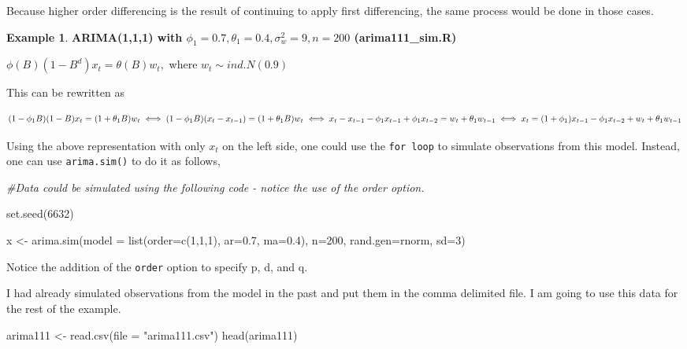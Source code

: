\documentclass[
]{book}
\newenvironment{Shaded}{\begin{snugshade}}{\end{snugshade}}
\newcommand{\AttributeTok}[1]{\textcolor[rgb]{0.77,0.63,0.00}{#1}}
\newcommand{\CommentTok}[1]{\textcolor[rgb]{0.56,0.35,0.01}{\textit{#1}}}
\newcommand{\DecValTok}[1]{\textcolor[rgb]{0.00,0.00,0.81}{#1}}
\newcommand{\FloatTok}[1]{\textcolor[rgb]{0.00,0.00,0.81}{#1}}
\newcommand{\FunctionTok}[1]{\textcolor[rgb]{0.00,0.00,0.00}{#1}}
\newcommand{\NormalTok}[1]{#1}
\newcommand{\OtherTok}[1]{\textcolor[rgb]{0.56,0.35,0.01}{#1}}
\newcommand{\StringTok}[1]{\textcolor[rgb]{0.31,0.60,0.02}{#1}}
\theoremstyle{definition}
\theoremstyle{definition}
\newtheorem{example}{Example}[chapter]
\theoremstyle{definition}
\theoremstyle{definition}
\theoremstyle{remark}
\begin{document}
Because higher order differencing is the result of continuing to apply first differencing, the same process would be done in those cases.

\begin{example}
\textbf{ARIMA(1,1,1) with \(\phi_1=0.7, \theta_1=0.4, \sigma_w^2=9, n=200\) (arima111\_sim.R)}

\(\phi(B)(1-B^d)x_t=\theta(B)w_t,\) where \(w_t \sim ind.N(0.9)\)

This can be rewritten as

\[(1-\phi_1B)(1-B)x_t=(1+\theta_1B)w_t\\
\iff (1-\phi_1B)(x_t-x_{t-1})=(1+\theta_1B)w_t\\
\iff x_t-x_{t-1}-\phi_1x_{t-1}+\phi_1x_{t-2}=w_t+\theta_1w_{t-1}\\
\iff x_t=(1+\phi_1)x_{t-1}-\phi_1x_{t-2}+w_t+\theta_1w_{t-1}\]

Using the above representation with only \(x_t\) on the left side, one could use the \texttt{for\ loop} to simulate observations from this model. Instead, one can use \texttt{arima.sim()} to do it as follows,

\begin{Shaded}
\begin{Highlighting}[]
\CommentTok{\#Data could be simulated using the following code {-} notice the use of the order option.  }

\FunctionTok{set.seed}\NormalTok{(}\DecValTok{6632}\NormalTok{)}

\NormalTok{x }\OtherTok{\textless{}{-}} \FunctionTok{arima.sim}\NormalTok{(}\AttributeTok{model =} \FunctionTok{list}\NormalTok{(}\AttributeTok{order=}\FunctionTok{c}\NormalTok{(}\DecValTok{1}\NormalTok{,}\DecValTok{1}\NormalTok{,}\DecValTok{1}\NormalTok{), }\AttributeTok{ar=}\FloatTok{0.7}\NormalTok{, }\AttributeTok{ma=}\FloatTok{0.4}\NormalTok{), }\AttributeTok{n=}\DecValTok{200}\NormalTok{, }\AttributeTok{rand.gen=}\NormalTok{rnorm, }\AttributeTok{sd=}\DecValTok{3}\NormalTok{)}
\end{Highlighting}
\end{Shaded}

Notice the addition of the \texttt{order} option to specify p, d, and q.

I had already simulated observations from the model in the past and put them in the comma delimited file. I am going to use this data for the rest of the example.

\begin{Shaded}
\begin{Highlighting}[]
\NormalTok{arima111 }\OtherTok{\textless{}{-}} \FunctionTok{read.csv}\NormalTok{(}\AttributeTok{file =} \StringTok{"arima111.csv"}\NormalTok{)}
\FunctionTok{head}\NormalTok{(arima111)}
\end{Highlighting}
\end{Shaded}


\end{example}
\end{document}
